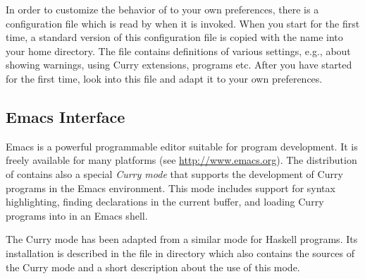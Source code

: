 In order to customize the behavior of \CYS to your own preferences,
there is a configuration file which is read by \CYS when it is invoked.
When you start \CYS for the first time, a standard version of
this configuration file is copied with the name
into your home directory. The file contains definitions
of various settings, e.g., about showing warnings, using Curry extensions,
programs etc.
After you have started \CYS for the first time, look into this file
and adapt it to your own preferences.


\subsection{Emacs Interface}

Emacs is a powerful programmable editor suitable for program development.
It is freely available for many platforms
(see \url{http://www.emacs.org}).
The distribution of \CYS contains also a special
\emph{Curry mode}
that supports the development of Curry programs in
the Emacs environment.
This mode includes support for syntax highlighting,
finding declarations in the current buffer, and
loading Curry programs into \CYS
in an Emacs shell.

The Curry mode has been adapted from a similar mode for Haskell programs.
Its installation is described in the file 
in directory  which also contains
the sources of the Curry mode and a short description about
the use of this mode.
